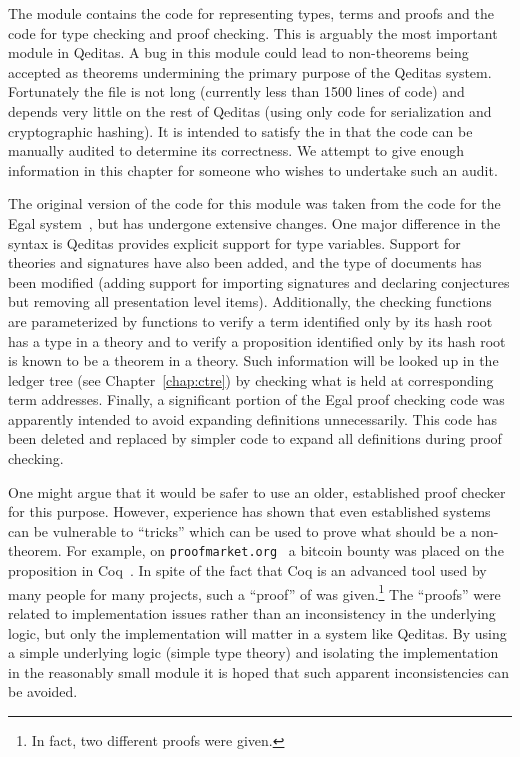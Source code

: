 The {} module contains the code for representing types,
terms and proofs
and the code for type checking and proof checking.
This is arguably the most important module in Qeditas.
A bug in this module could lead to non-theorems being accepted as theorems
undermining the primary purpose of the Qeditas system.
Fortunately the {} file is not long (currently less than 1500 lines of code)
and depends very little on the rest of Qeditas (using only
code for serialization and cryptographic hashing).
It is intended to satisfy the {}
in that the code can be manually audited to determine its correctness.
We attempt to give enough information in this chapter for someone who wishes to undertake such an audit.

The original version of the code for this module was taken from the code for the
Egal system~\cite{Brown2014},
but has undergone extensive changes.
One major difference in the syntax is Qeditas provides explicit support for type variables.
Support for theories and signatures have also been added, and the type of documents has been modified
(adding support for importing signatures and declaring conjectures but removing all presentation level items).
Additionally, the checking functions are parameterized by functions to verify a term
identified only by its hash root has a type in a theory
and to verify a proposition identified only by its hash root is known to be a theorem in a theory.
Such information will be looked up in the ledger tree (see Chapter~\ref{chap:ctre}) by checking what is held at corresponding term addresses.
Finally, a significant portion of the Egal proof checking code was apparently
intended to avoid expanding definitions unnecessarily.
This code has been deleted and replaced by
simpler code to expand all definitions during proof checking.

One might argue that it would be safer to use an older, established proof checker for this purpose.
However, experience has shown that even established systems can be vulnerable to ``tricks''
which can be used to prove what should be a non-theorem.
For example, on {\tt{proofmarket.org}}~\cite{ProofMarket}
a bitcoin bounty was placed on the proposition {} in Coq~\cite{Coq:manual}.
In spite of the fact that Coq is an advanced tool used by many people for many projects,
such a ``proof'' of {} was given.\footnote{In fact, two different proofs were given.}
The ``proofs'' were related to implementation issues rather than an inconsistency
in the underlying logic, but only the implementation will matter in a system like Qeditas.
By using a simple underlying logic (simple type theory)
and isolating the implementation in the reasonably small module {}
it is hoped that such apparent inconsistencies can be avoided.

